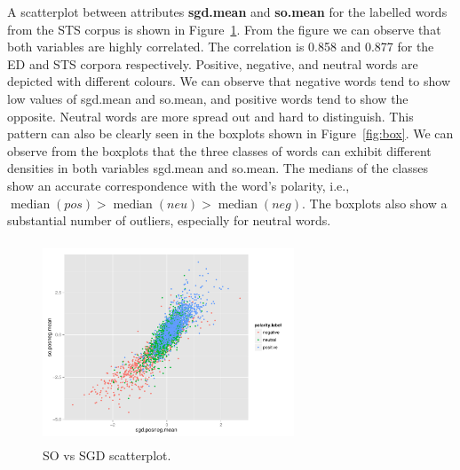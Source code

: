 \documentclass{sig-alternate}
\begin{document}
A scatterplot between attributes \textbf{sgd.mean} and \textbf{so.mean} for the labelled words from the STS corpus is shown in Figure~\ref{fig:sosgd}. From the figure we can observe that both variables are highly correlated. The correlation is 0.858 and 0.877 for the ED and STS corpora respectively. Positive, negative, and neutral words are depicted with different colours. We can observe that negative words tend to show low values of sgd.mean and so.mean, and positive words tend to show the opposite. Neutral words are more spread out and hard to distinguish.  This pattern can also be clearly seen in the boxplots shown in Figure~\ref{fig:box}. We can observe from the boxplots that the three classes of words can exhibit different densities in both variables sgd.mean and so.mean. The medians of the classes show an accurate correspondence with the word's polarity, i.e., $\operatorname{median}(pos) > \operatorname{median}(neu) > \operatorname{median}(neg)$. The boxplots also show a substantial number of outliers, especially for neutral words. 


\begin{figure}[htb]
	\centering
	 \includegraphics[width=7.5cm,height=6cm]{SGDSO.pdf}
	\caption{SO vs SGD scatterplot.}
	\label{fig:sosgd}
\end{figure}
\end{document}
